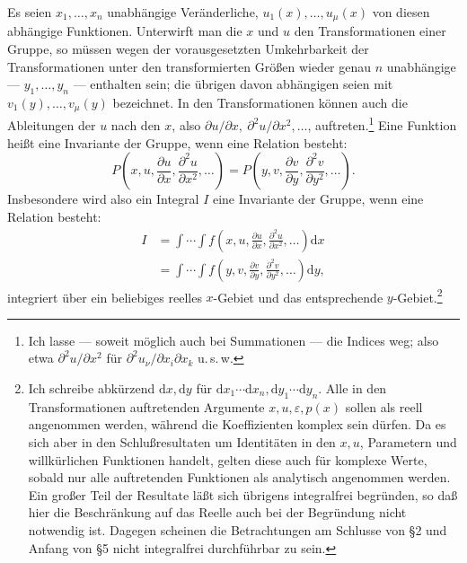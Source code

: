 \documentclass[11pt]{article}
\providecommand{\eps}{\varepsilon}
\providecommand{\dd}{\mathrm d}
\providecommand{\p}{\partial}
\providecommand{\p}{\partial}
\providecommand{\dd}{\mathrm d}
\begin{document}
Es seien \(x_1,\ldots,x_n\) unabhängige Veränderliche, \(u_1(x),\ldots,u_\mu(x)\) von diesen abhängige Funktionen. Unterwirft man die \(x\) und \(u\) den Transformationen einer Gruppe, so müssen wegen der vorausgesetzten Umkehrbarkeit der Transformationen unter den transformierten Größen wieder genau \(n\) unabhängige --- \(y_1,\ldots,y_n\) --- enthalten sein; die übrigen davon abhängigen seien mit \(v_1(y),\ldots,v_\mu(y)\) bezeichnet. In den Transformationen können auch die Ableitungen der \(u\) nach den \(x\), also \(\p u/\p x,\ \p^2u/\p x^2,\ldots\), auftreten.\footnote{Ich lasse --- soweit möglich auch bei Summationen --- die Indices weg; also etwa \(\p^2u/\p x^2\) für \(\p^2u_\nu/\p x_i\p x_k\) u.\,s.\,w.} Eine Funktion heißt eine Invariante der Gruppe, wenn eine Relation besteht:
\[
P\!\left(x,u,\frac{\p u}{\p x},\frac{\p^2u}{\p x^2},\ldots\right)
 =
P\!\left(y,v,\frac{\p v}{\p y},\frac{\p^2v}{\p y^2},\ldots\right).
\]
Insbesondere wird also ein Integral \(I\) eine Invariante der Gruppe, wenn eine Relation besteht:
\begin{equation}
\begin{aligned}
I&=\int\!\cdots\!\int f\!\left(x,u,\frac{\p u}{\p x},\frac{\p^2u}{\p x^2},\ldots\right)\dd x\\
 &=\int\!\cdots\!\int f\!\left(y,v,\frac{\p v}{\p y},\frac{\p^2v}{\p y^2},\ldots\right)\dd y,
\end{aligned}
\tag{1}
\end{equation}
integriert über ein beliebiges reelles \(x\)-Gebiet und das entsprechende \(y\)-Gebiet.\footnote{Ich schreibe abkürzend \(\dd x,\dd y\) für \(\dd x_1\cdots \dd x_n,\dd y_1\cdots \dd y_n\). Alle in den Transformationen auftretenden Argumente \(x,u,\eps,p(x)\) sollen als reell angenommen werden, während die Koeffizienten komplex sein dürfen. Da es sich aber in den Schlußresultaten um Identitäten in den \(x,u\), Parametern und willkürlichen Funktionen handelt, gelten diese auch für komplexe Werte, sobald nur alle auftretenden Funktionen als analytisch angenommen werden. Ein großer Teil der Resultate läßt sich übrigens integralfrei begründen, so daß hier die Beschränkung auf das Reelle auch bei der Begründung nicht notwendig ist. Dagegen scheinen die Betrachtungen am Schlusse von \S{}2 und Anfang von \S{}5 nicht integralfrei durchführbar zu sein.}
\end{document}
